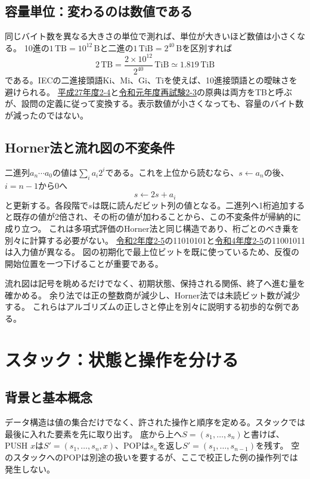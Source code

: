 \subsection{容量単位：変わるのは数値である}\label{theory:information:capacity}
同じバイト数を異なる大きさの単位で測れば、単位が大きいほど数値は小さくなる。
10進の$1\,\mathrm{TB}=10^{12}\,\mathrm{B}$と二進の$1\,\mathrm{TiB}=2^{40}\,\mathrm{B}$を区別すれば
\[
 2\,\mathrm{TB}=\frac{2\times10^{12}}{2^{40}}\,\mathrm{TiB}
 \simeq1.819\,\mathrm{TiB}
\]
である。IECの二進接頭語Ki、Mi、Gi、Tiを使えば、10進接頭語との曖昧さを避けられる\cite{nist_binary_prefix}。
\hyperref[q:h27-reg-basic-2-4]{平成27年度2-4}と\hyperref[q:r01-ret-basic-2-3]{令和元年度再試験2-3}の原典は両方をTBと呼ぶが、設問の定義に従って変換する。表示数値が小さくなっても、容量のバイト数が減ったのではない。

\subsection{Horner法と流れ図の不変条件}\label{theory:information:horner}
二進列$a_n\cdots a_0$の値は$\sum_i a_i2^i$である。これを上位から読むなら、$s\leftarrow a_n$の後、$i=n-1$から0へ
\[
 s\leftarrow2s+a_i
\]
と更新する。各段階で$s$は既に読んだビット列の値となる。二進列へ1桁追加すると既存の値が2倍され、その桁の値が加わることから、この不変条件が帰納的に成り立つ。
これは多項式評価のHorner法と同じ構造であり、桁ごとのべき乗を別々に計算する必要がない。
\hyperref[q:r02-reg-basic-2-5]{令和2年度2-5}の11010101と\hyperref[q:r04-reg-basic-2-5]{令和4年度2-5}の11001011は入力値が異なる。
図の初期化で最上位ビットを既に使っているため、反復の開始位置を一つ下げることが重要である。
\begin{tcolorbox}[title=情報工学への接続]
流れ図は記号を眺めるだけでなく、初期状態、保持される関係、終了へ進む量を確かめる。
余り法では正の整数商が減少し、Horner法では未読ビット数が減少する。
これらはアルゴリズムの正しさと停止を別々に説明する初歩的な例である。
\end{tcolorbox}
\section{スタック：状態と操作を分ける}
\subsection{背景と基本概念}
データ構造は値の集合だけでなく、許された操作と順序を定める。スタックでは最後に入れた要素を先に取り出す。
底から上へ$S=(s_1,\ldots,s_n)$と書けば、PUSH $x$は$S'=(s_1,\ldots,s_n,x)$、POPは$s_n$を返し$S'=(s_1,\ldots,s_{n-1})$を残す。
空のスタックへのPOPは別途の扱いを要するが、ここで校正した例の操作列では発生しない。
